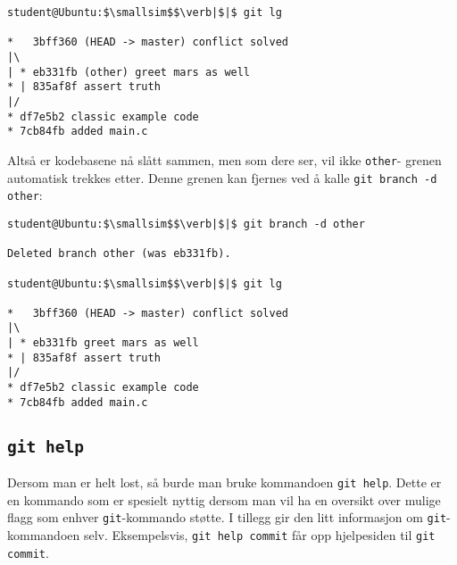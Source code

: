 \begin{alphasection}
\begin{lstlisting}[mathescape=true]
student@Ubuntu:$\smallsim$$\verb|$|$ git lg

*   3bff360 (HEAD -> master) conflict solved
|\  
| * eb331fb (other) greet mars as well
* | 835af8f assert truth
|/  
* df7e5b2 classic example code
* 7cb84fb added main.c

\end{lstlisting}


Altså er kodebasene nå slått sammen, men som dere ser, vil ikke \verb|other|-
grenen automatisk trekkes etter.  Denne grenen kan fjernes ved å kalle \verb|git branch -d other|:

\clearpage

\begin{lstlisting}[mathescape=true]
student@Ubuntu:$\smallsim$$\verb|$|$ git branch -d other

Deleted branch other (was eb331fb).

student@Ubuntu:$\smallsim$$\verb|$|$ git lg

*   3bff360 (HEAD -> master) conflict solved
|\  
| * eb331fb greet mars as well
* | 835af8f assert truth
|/  
* df7e5b2 classic example code
* 7cb84fb added main.c
\end{lstlisting}

\subsection{\texttt{git help}}

Dersom man er helt lost, så burde man bruke kommandoen \verb|git help|. Dette er en kommando som er spesielt nyttig dersom man vil ha en oversikt over mulige flagg som enhver \verb|git|-kommando støtte. I tillegg gir den litt informasjon om \verb|git|-kommandoen selv. Eksempelsvis, \verb|git help commit| får opp hjelpesiden til \verb|git commit|.

\end{alphasection}
\setcounter{section}{0}
